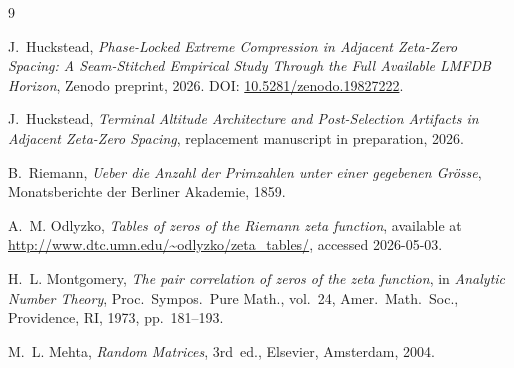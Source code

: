 \documentclass[11pt]{article}
\newcommand{\principaldoi}{10.5281/zenodo.19827222}
\begin{document}
\begin{thebibliography}{9}

J.~Huckstead,
\emph{Phase-Locked Extreme Compression in Adjacent Zeta-Zero Spacing:
  A Seam-Stitched Empirical Study Through the Full Available LMFDB
  Horizon},
Zenodo preprint, 2026.
DOI: \href{https://doi.org/\principaldoi}{\principaldoi}.

J.~Huckstead,
\emph{Terminal Altitude Architecture and Post-Selection Artifacts in Adjacent Zeta-Zero Spacing},
replacement manuscript in preparation, 2026.

B.~Riemann,
\emph{Ueber die Anzahl der Primzahlen unter einer gegebenen Gr\"osse},
Monatsberichte der Berliner Akademie, 1859.

A.~M. Odlyzko,
\emph{Tables of zeros of the Riemann zeta function},
available at
\url{http://www.dtc.umn.edu/~odlyzko/zeta_tables/},
accessed 2026-05-03.

H.~L. Montgomery,
\emph{The pair correlation of zeros of the zeta function},
in \emph{Analytic Number Theory},
Proc.\ Sympos.\ Pure Math., vol.~24,
Amer.\ Math.\ Soc., Providence, RI, 1973, pp.~181--193.

M.~L. Mehta,
\emph{Random Matrices},
3rd~ed., Elsevier, Amsterdam, 2004.

\end{thebibliography}
\end{document}
